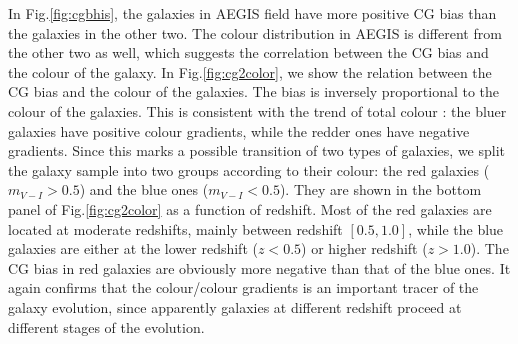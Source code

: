 \documentclass[useAMS,usenatbib]{mnras}
\begin{document}
In Fig.\ref{fig:cgbhis}, the galaxies in AEGIS field have more
positive CG bias than the galaxies in the other two. The colour
distribution in AEGIS is different from the other two as well, which
suggests the correlation between the CG bias and the colour of the
galaxy. In Fig.\ref{fig:cg2color}, we show the relation between the CG
bias and the colour of the galaxies. The bias is inversely
proportional to the colour of the galaxies. This is consistent with
the trend of total colour \citep[e.g.][]{2010MNRAS.407..144T}: the
bluer galaxies have positive colour gradients, while the redder ones
have negative gradients. Since this marks a possible transition of two
types of galaxies, we split the galaxy sample into two groups
according to their colour: the red galaxies ($m_{V-I}>0.5$) and the
blue ones ($m_{V-I}<0.5$). They are shown in the bottom panel of
Fig.\ref{fig:cg2color} as a function of redshift. Most of the red
galaxies are located at moderate redshifts, mainly between redshift
$[0.5,1.0]$, while the blue galaxies are either at the lower redshift
($z<0.5$) or higher redshift ($z>1.0$). The CG bias in red galaxies
are obviously more negative than that of the blue ones. It again
confirms that the colour/colour gradients is an important tracer of
the galaxy evolution, since apparently galaxies at different redshift
proceed at different stages of the evolution.
\end{document}
